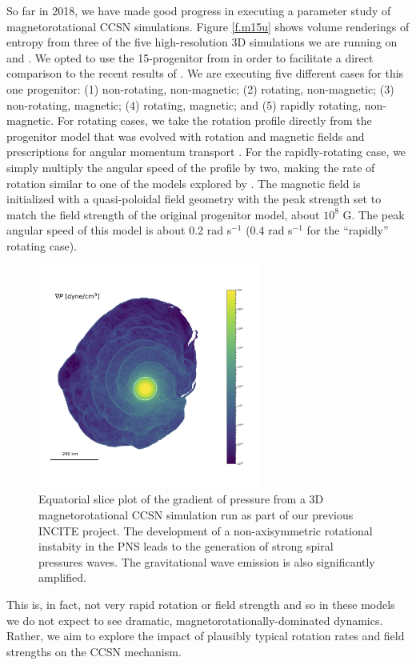 \documentclass[12pt]{article}
\begin{document}
So far in 2018, we have made good progress in executing a parameter study of magnetorotational CCSN simulations. 
Figure \ref{f.m15u} shows volume renderings of entropy from three of the five high-resolution 3D simulations we are running on \mira and \thet. 
We opted to use the 15-\msun progenitor from \citet{heger:2005} in order to facilitate a direct comparison to the recent results of \citet{summa:2018}.
We are executing five different cases for this one progenitor: (1) non-rotating, non-magnetic; (2) rotating, non-magnetic; (3) non-rotating, magnetic; (4) rotating, magnetic; and (5) rapidly rotating, non-magnetic. 
For rotating cases, we take the rotation profile directly from the progenitor model that was evolved with rotation and magnetic fields and prescriptions for angular momentum transport \citep{heger:2005}. 
For the rapidly-rotating case, we simply multiply the angular speed of the profile by two, making the rate of rotation similar to one of the models explored by \citet{summa:2018}.
The magnetic field is initialized with a quasi-poloidal field geometry with the peak strength set to match the field strength of the original progenitor model, about $10^8$ G. 
The peak angular speed of this model is about 0.2 rad s$^{-1}$ (0.4 rad s$^{-1}$ for the ``rapidly'' rotating case). 
\begin{figure}
  \includegraphics[width=2.9in]{./fig_gradp_m25_o110_b9_0566.png}
  \caption{Equatorial slice plot of the gradient of pressure from a 3D magnetorotational CCSN simulation run as part of our previous INCITE project. The development of a non-axisymmetric rotational instabity in the PNS leads to the generation of strong spiral pressures waves. The gravitational wave emission is also significantly amplified.}
  \label{f.gradp}
\end{figure}
This is, in fact, not very rapid rotation or field strength and so in these models we do not expect to see dramatic, magnetorotationally-dominated dynamics. 
Rather, we aim to explore the impact of plausibly typical rotation rates and field strengths on the CCSN mechanism. 
\end{document}
